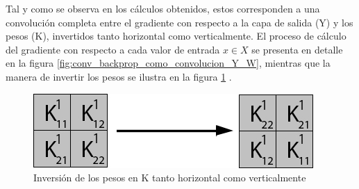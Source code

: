 Tal y como se observa en los cálculos obtenidos, estos corresponden a una convolución completa entre el gradiente con respecto a la capa de salida (Y) y los pesos (K), invertidos tanto horizontal como verticalmente. El proceso de cálculo del gradiente con respecto a cada valor de entrada $x \in X$ se presenta en detalle en la figura \ref{fig:conv_backprop_como_convolucion_Y_W}, mientras que la manera de invertir los pesos se ilustra en la figura \ref{fig:flip_W} \cite{conv_backprop}.

\begin{figure}[H]
	\centering
	\includegraphics[width=0.8\linewidth]{imagenes/flip_pesos.jpg}  
	\caption{Inversión de los pesos en K tanto horizontal como verticalmente}
	\label{fig:flip_W}
\end{figure}

